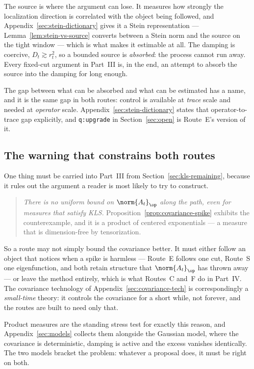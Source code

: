 \documentclass[../../main.tex]{subfiles}
\begin{document}
The source is where the argument can lose. It measures how strongly the localization direction is
correlated with the object being followed, and Appendix~\ref{sec:stein-dictionary} gives it a
Stein representation --- Lemma~\ref{lem:stein-vs-source} converts between a Stein norm and the
source on the tight window --- which is what makes it estimable at all. The damping is coercive,
$D_t\gtrsim r_t^2$, so a bounded source is \emph{absorbed}: the process cannot run away. Every
fixed-cut argument in Part~III is, in the end, an attempt to absorb the source into the damping
for long enough.

The gap between what can be absorbed and what can be estimated has a name, and it is the same
gap in both routes: control is available at \emph{trace} scale and needed at \emph{operator}
scale. Appendix~\ref{sec:stein-dictionary} states that operator-to-trace gap explicitly, and
\texttt{q:upgrade} in Section~\ref{sec:open} is Route~E's version of it.

\subsection{The warning that constrains both routes}
\label{subsec:prelude-warning}

One thing must be carried into Part~III from Section~\ref{sec:kls-remaining}, because it rules
out the argument a reader is most likely to try to construct.

\begin{quote}
  \emph{There is no uniform bound on $\norm{A_t}_\op$ along the path, even for measures that
  satisfy KLS.} Proposition~\ref{prop:covariance-spike} exhibits the counterexample, and it is a
  product of centered exponentials --- a measure that is dimension-free by tensorization.
\end{quote}

So a route may not simply bound the covariance better. It must either follow an object that
notices when a spike is harmless --- Route~E follows one cut, Route~S one eigenfunction, and both
retain structure that $\norm{A_t}_\op$ has thrown away --- or leave the method entirely, which is
what Routes~C and~F do in Part~IV. The covariance technology of
Appendix~\ref{sec:covariance-tech} is correspondingly a \emph{small-time} theory: it controls the
covariance for a short while, not forever, and the routes are built to need only that.

Product measures are the standing stress test for exactly this reason, and
Appendix~\ref{sec:models} collects them alongside the Gaussian model, where the covariance is
deterministic, damping is active and the excess vanishes identically. The two models bracket the
problem: whatever a proposal does, it must be right on both.
\end{document}
